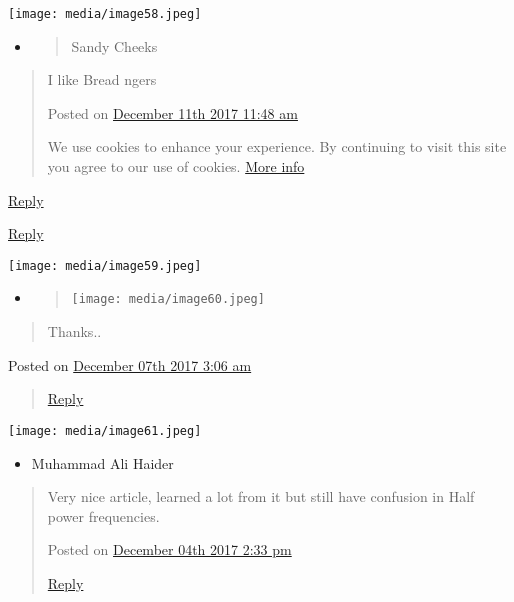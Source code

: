 \documentclass[]{article}
\begin{document}
\texttt{[image: media/image58.jpeg]}

\begin{itemize}
\item
  \begin{quote}
  Sandy Cheeks
  \end{quote}
\end{itemize}

\begin{quote}
I like Bread ngers

Posted on \protect\hyperlink{page10}{December 11th 2017 \textbar{} 11:48
am}

We use cookies to enhance your experience. By continuing to visit this
site you agree to our use of cookies.
\href{http://wikipedia.org/wiki/HTTP_cookie}{More info}
\end{quote}

\href{https://www.electronics-tutorials.ws/accircuits/series-resonance.html?replytocom=44696\#respond}{Reply}

\href{https://www.electronics-tutorials.ws/accircuits/series-resonance.html?replytocom=44325\#respond}{Reply}

\texttt{[image: media/image59.jpeg]}

\begin{itemize}
\item
  \begin{quote}
  \texttt{[image: media/image60.jpeg]}
  \end{quote}
\end{itemize}

\begin{quote}
Thanks..
\end{quote}

Posted on \protect\hyperlink{page11}{December 07th 2017 \textbar{} 3:06
am}

\begin{quote}
\href{https://www.electronics-tutorials.ws/accircuits/series-resonance.html?replytocom=43874\#respond}{Reply}
\end{quote}

\texttt{[image: media/image61.jpeg]}

\begin{itemize}
\item
  Muhammad Ali Haider
\end{itemize}

\begin{quote}
Very nice article, learned a lot from it but still have confusion in
Half power frequencies.

Posted on \protect\hyperlink{page11}{December 04th 2017 \textbar{} 2:33
pm}

\href{https://www.electronics-tutorials.ws/accircuits/series-resonance.html?replytocom=43583\#respond}{Reply}
\end{quote}
\end{document}

